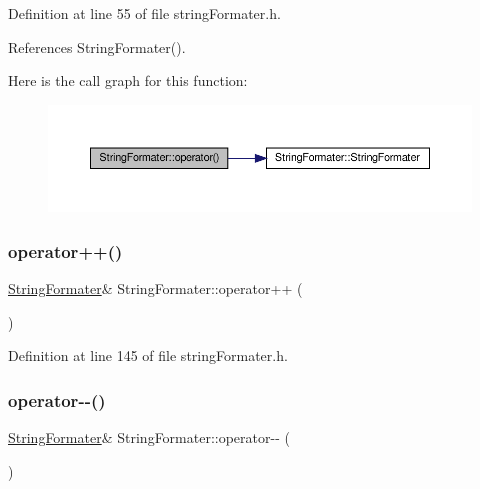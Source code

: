 Definition at line 55 of file string\+Formater.\+h.



References String\+Formater().

Here is the call graph for this function\+:
\nopagebreak
\begin{figure}[H]
\begin{center}
\leavevmode
\includegraphics[width=350pt]{classStringFormater_a0fe6b7b48c1660c4a009da745c05451c_cgraph}
\end{center}
\end{figure}
\mbox{\label{classStringFormater_ab612366361a069eae7a1ebd645b47f62}} 
\subsubsection{\texorpdfstring{operator++()}{operator++()}}
{\footnotesize\ttfamily \hyperlink{classStringFormater}{String\+Formater}\& String\+Formater\+::operator++ (\begin{DoxyParamCaption}{ }\end{DoxyParamCaption})\hspace{0.3cm}{\ttfamily [inline]}}



Definition at line 145 of file string\+Formater.\+h.

\mbox{\label{classStringFormater_a2d42daa669ee9405b94b35ea121a9f95}} 
\subsubsection{\texorpdfstring{operator-\/-\/()}{operator--()}}
{\footnotesize\ttfamily \hyperlink{classStringFormater}{String\+Formater}\& String\+Formater\+::operator-\/-\/ (\begin{DoxyParamCaption}{ }\end{DoxyParamCaption})\hspace{0.3cm}{\ttfamily [inline]}}



